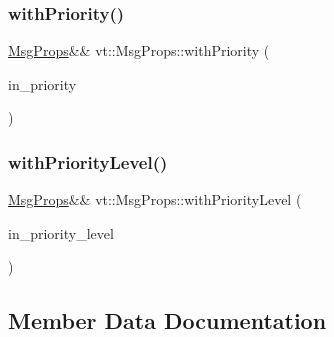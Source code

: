 \mbox{\label{structvt_1_1_msg_props_a3b21bcfae4117bc3adbdd87cecf2deae}} 
\subsubsection{\texorpdfstring{with\+Priority()}{withPriority()}}
{\footnotesize\ttfamily \hyperlink{structvt_1_1_msg_props}{Msg\+Props}\&\& vt\+::\+Msg\+Props\+::with\+Priority (\begin{DoxyParamCaption}\item[{\mbox{[}\mbox{[}maybe\+\_\+unused\mbox{]} \mbox{]} \hyperlink{namespacevt_a86bff9f556eb761b27fc8600d006ac04}{Priority\+Type}}]{in\+\_\+priority }\end{DoxyParamCaption})\hspace{0.3cm}{\ttfamily [inline]}}

\mbox{\label{structvt_1_1_msg_props_a7d969b36e061722a3a10453fc29e41b9}} 
\subsubsection{\texorpdfstring{with\+Priority\+Level()}{withPriorityLevel()}}
{\footnotesize\ttfamily \hyperlink{structvt_1_1_msg_props}{Msg\+Props}\&\& vt\+::\+Msg\+Props\+::with\+Priority\+Level (\begin{DoxyParamCaption}\item[{\mbox{[}\mbox{[}maybe\+\_\+unused\mbox{]} \mbox{]} \hyperlink{namespacevt_a53e07fdb3351b0f263e0dfd51b968d5e}{Priority\+Level\+Type}}]{in\+\_\+priority\+\_\+level }\end{DoxyParamCaption})\hspace{0.3cm}{\ttfamily [inline]}}



\subsection{Member Data Documentation}
\mbox{\label{structvt_1_1_msg_props_a96c932077634610b92e605f617ee2a2d}} 
